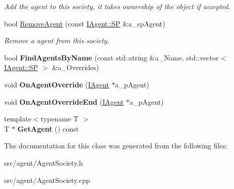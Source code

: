 \begin{DoxyCompactItemize}
\begin{DoxyCompactList}\small\item\em Add the agent to this society, it takes ownership of the object if accepted. \end{DoxyCompactList}\item 
\mbox{\label{class_agent_society_a4edf60330b175d2f55e670fc834480cd}} 
bool \hyperlink{class_agent_society_a4edf60330b175d2f55e670fc834480cd}{Remove\+Agent} (const \hyperlink{class_i_agent_a9e88f0528d282c33200a2d43d1c29a73}{I\+Agent\+::\+SP} \&a\+\_\+sp\+Agent)
\begin{DoxyCompactList}\small\item\em Remove a agent from this society. \end{DoxyCompactList}\item 
\mbox{\label{class_agent_society_a0e61af59353f3b4866105e81aa7e4bcb}} 
bool {\bfseries Find\+Agents\+By\+Name} (const std\+::string \&a\+\_\+\+Name, std\+::vector$<$ \hyperlink{class_i_agent_a9e88f0528d282c33200a2d43d1c29a73}{I\+Agent\+::\+SP} $>$ \&a\+\_\+\+Overrides)
\item 
\mbox{\label{class_agent_society_ae92d7bb4c6b7f7ce75c4568496dd1719}} 
void {\bfseries On\+Agent\+Override} (\hyperlink{class_i_agent}{I\+Agent} $\ast$a\+\_\+p\+Agent)
\item 
\mbox{\label{class_agent_society_a3949bca346a6d643d14a985605bff3c1}} 
void {\bfseries On\+Agent\+Override\+End} (\hyperlink{class_i_agent}{I\+Agent} $\ast$a\+\_\+p\+Agent)
\item 
\mbox{\label{class_agent_society_af79303e6e9a1ffdbaade0abe3b3cffee}} 
{\footnotesize template$<$typename T $>$ }\\T $\ast$ {\bfseries Get\+Agent} () const
\end{DoxyCompactItemize}


The documentation for this class was generated from the following files\+:\begin{DoxyCompactItemize}
\item 
src/agent/Agent\+Society.\+h\item 
src/agent/Agent\+Society.\+cpp\end{DoxyCompactItemize}
